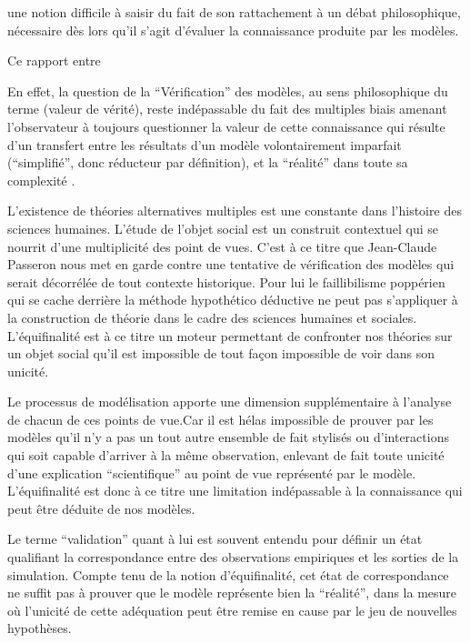  une notion difficile à saisir du fait de son rattachement à un débat philosophique, nécessaire dès lors qu'il s'agit d'évaluer la connaissance produite par les modèles.

Ce rapport entre  


En effet, la question de la \enquote{Vérification} des modèles, au sens philosophique du terme (valeur de vérité), reste indépassable du fait des multiples biais amenant l'observateur à toujours questionner la valeur de cette connaissance qui résulte d'un transfert entre les résultats d'un modèle volontairement imparfait (\enquote{simplifié}, donc réducteur par définition), et la \enquote{réalité} dans toute sa complexité \autocite{OSullivan2004}.


L’existence de théories alternatives multiples est une constante dans l’histoire des sciences humaines. L'étude de l'objet social est un construit contextuel qui se nourrit d'une multiplicité des point de vues. C'est à ce titre que Jean-Claude Passeron \autocite{Passeron2006} nous met en garde contre une tentative de vérification des modèles qui serait décorrélée de tout contexte historique. Pour lui le faillibilisme poppérien qui se cache derrière la méthode hypothético déductive ne peut pas s'appliquer à la construction de théorie dans le cadre des sciences humaines et sociales. L'équifinalité est à ce titre un moteur permettant de confronter nos théories sur un objet social  qu'il est impossible de tout façon impossible de voir dans son unicité. 

Le processus de modélisation apporte une dimension supplémentaire à l'analyse de chacun de ces points de vue.Car il est hélas impossible de prouver par les modèles qu'il n'y a pas un tout autre ensemble de fait stylisés ou d'interactions qui soit capable d'arriver à la même observation, enlevant de fait toute unicité d’une explication \enquote{scientifique} au point de vue représenté par le modèle. L'équifinalité est donc à ce titre une limitation indépassable à la connaissance qui peut être déduite de nos modèles.



Le terme \enquote{validation} quant à lui est souvent entendu pour définir un état qualifiant la correspondance entre des observations empiriques et les sorties de la simulation. Compte tenu de la notion d'équifinalité, cet état de correspondance ne suffit pas à prouver que le modèle représente bien la \enquote{réalité}, dans la mesure où l’unicité de cette adéquation peut être remise en cause par le jeu de nouvelles hypothèses. 

